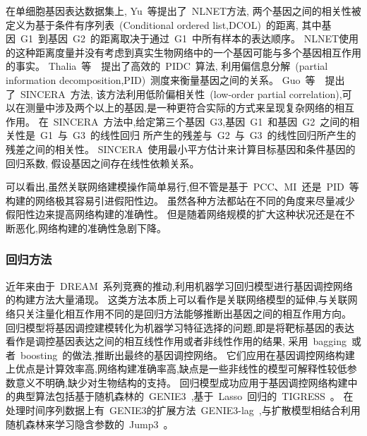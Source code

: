 在单细胞基因表达数据集上,
Yu~等提出了~NLNET方法\cite{yu2013hierarchical}, 
两个基因之间的相关性被定义为基于条件有序列表~(Conditional ordered list,DCOL)~的距离,
其中基因~G1~到基因~G2~的距离取决于通过~G1~中所有样本的表达顺序。
NLNET使用的这种距离度量并没有考虑到真实生物网络中的一个基因可能与多个基因相互作用的事实。
Thalia~等~\cite{chan2017gene}~提出了高效的~PIDC~算法,
利用偏信息分解~(partial information decomposition,PID)~测度来衡量基因之间的关系。
Guo~等~\cite{guo2015sincera}~提出了~SINCERA~方法, 该方法利用低阶偏相关性~(low-order partial correlation),可以在测量中涉及两个以上的基因,是一种更符合实际的方式来呈现复杂网络的相互作用。
在~SINCERA~方法中,给定第三个基因~G3,基因~G1~和基因~G2~之间的相关性是~G1~与~G3~的线性回归
所产生的残差与~G2~与~G3~的线性回归所产生的残差之间的相关性。
SINCERA~使用最小平方估计来计算目标基因和条件基因的回归系数, 假设基因之间存在线性依赖关系。

可以看出,虽然关联网络建模操作简单易行,但不管是基于~PCC、MI~还是~PID~等构建的网络极其容易引进假阳性边。
虽然各种方法都站在不同的角度来尽量减少假阳性边来提高网络构建的准确性。
但是随着网络规模的扩大这种状况还是在不断恶化,网络构建的准确性急剧下降。

\subsubsection{回归方法}
近年来由于~DREAM~系列竞赛的推动,利用机器学习回归模型进行基因调控网络的构建方法大量涌现。
这类方法本质上可以看作是关联网络模型的延伸,与关联网络只关注量化相互作用不同的是回归方法能够推断出基因之间的相互作用方向。
回归模型将基因调控建模转化为机器学习特征选择的问题,即是将靶标基因的表达看作是调控基因表达之间的相互线性作用或者非线性作用的结果,
采用~bagging~或者~boosting~的做法,推断出最终的基因调控网络。
它们应用在基因调控网络构建上优点是计算效率高,网络构建准确率高,缺点是一些非线性的模型可解释性较低参数意义不明确,缺少对生物结构的支持。
回归模型成功应用于基因调控网络构建中的典型算法包括基于随机森林的~GENIE3~\cite{Huynh-Thu2010},基于~Lasso~回归的~TIGRESS~\cite{Haury2012}。
在处理时间序列数据上有~GENIE3的扩展方法~GENIE3-lag~\cite{huynh2012machine},与扩散模型相结合利用随机森林来学习隐含参数的~Jump3~\cite{Huynh-Thu2014}。

